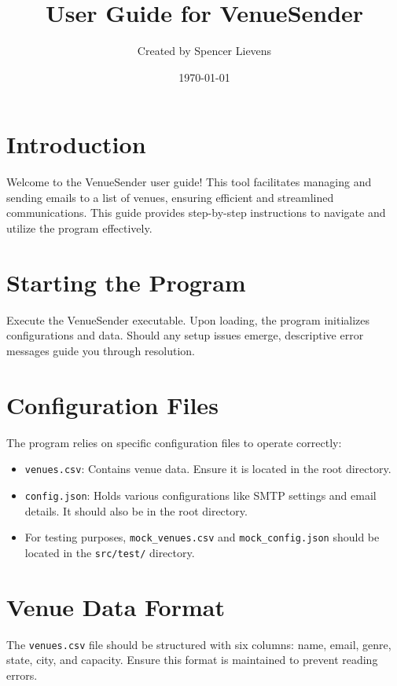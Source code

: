 \documentclass{article}
\title{\color{textcolor}User Guide for VenueSender}
\begin{document}
	
	\author{Created by Spencer Lievens}
	\date{\today}
	
	\maketitle
	
	\section*{Introduction}
	Welcome to the VenueSender user guide! This tool facilitates managing and sending emails to a list of venues, ensuring efficient and streamlined communications. This guide provides step-by-step instructions to navigate and utilize the program effectively.
	
	\section*{Starting the Program}
	Execute the VenueSender executable. Upon loading, the program initializes configurations and data. Should any setup issues emerge, descriptive error messages guide you through resolution.
	
	\section*{Configuration Files}
	The program relies on specific configuration files to operate correctly:
	\begin{itemize}
		\item \texttt{venues.csv}: Contains venue data. Ensure it is located in the root directory.
		\item \texttt{config.json}: Holds various configurations like SMTP settings and email details. It should also be in the root directory.
		\item For testing purposes, \texttt{mock\_venues.csv} and \texttt{mock\_config.json} should be located in the \texttt{src/test/} directory.
	\end{itemize}
	
	\section*{Venue Data Format}
	The \texttt{venues.csv} file should be structured with six columns: name, email, genre, state, city, and capacity. Ensure this format is maintained to prevent reading errors.
	
\end{document}

